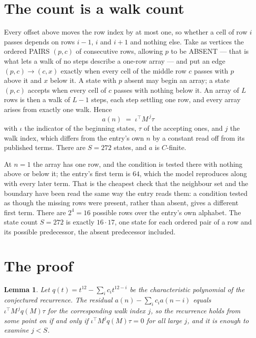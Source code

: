 \documentclass[11pt,a4paper]{article}
\theoremstyle{plain}
\newtheorem{lemma}[theorem]{Lemma}
\theoremstyle{definition}
\begin{document}
\section{The count is a walk count}

Every offset above moves the row index by at most one, so whether a cell of row $i$ passes
depends on rows $i-1$, $i$ and $i+1$ and nothing else. Take as vertices the ordered PAIRS
$(p,c)$ of consecutive rows, allowing $p$ to be ABSENT --- that is what lets a walk of no steps
describe a one-row array --- and put an edge $(p,c)\to(c,x)$ exactly when every cell of the
middle row $c$ passes with $p$ above it and $x$ below it. A state with $p$ absent may begin an
array; a state $(p,c)$ accepts when every cell of $c$ passes with nothing below it. An array of
$L$ rows is then a walk of $L-1$ steps, each step settling one row, and every array arises from
exactly one walk. Hence
\[
a(n)\;=\;\iota^{\!\top}M^{\,j}\tau
\]
with $\iota$ the indicator of the beginning states, $\tau$ of the accepting ones, and $j$ the
walk index, which differs from the entry's own $n$ by a constant read off from its published
terms. There are $S=272$ states, and $a$ is $C$-finite.

At $n=1$ the array has one row, and
the condition is tested there with nothing above or below it; the entry's first term is
$64$, which the model reproduces along with every later term. That is the cheapest check
that the neighbour set and the boundary have been read the same way the entry reads them: a
condition tested as though the missing rows were present, rather than absent, gives a different
first term. There are $2^{4}=16$ possible rows over the entry's own alphabet. The state count $S=272$ is exactly $16\cdot17$,
one state for each ordered pair of a row and its possible predecessor, the absent predecessor
included.

\section{The proof}

\begin{lemma}\label{lem:crit}
Let $q(t)=t^{12}-\sum_i c_it^{12-i}$ be the characteristic polynomial of the
conjectured recurrence. The residual $a(n)-\sum_ic_ia(n-i)$ equals
$\iota^{\!\top}M^{\,j}q(M)\tau$ for the corresponding walk index $j$, so the recurrence
holds from some point on if and only if $\iota^{\!\top}M^{j}q(M)\tau=0$ for all large $j$,
and it is enough to examine $j<S$.
\end{lemma}
\end{document}
